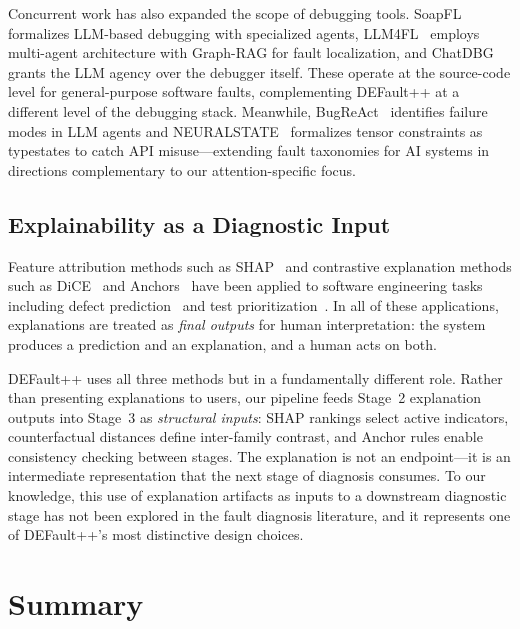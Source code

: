 Concurrent work has also expanded the scope of debugging tools. SoapFL~\cite{soapfl2025} formalizes LLM-based debugging with specialized agents, LLM4FL~\cite{llm4fl2024} employs multi-agent architecture with Graph-RAG for fault localization, and ChatDBG~\cite{chatdbg2025} grants the LLM agency over the debugger itself. These operate at the source-code level for general-purpose software faults, complementing DEFault++ at a different level of the debugging stack. Meanwhile, BugReAct~\cite{bugreact2026} identifies failure modes in LLM agents and NEURALSTATE~\cite{neuralstate2026} formalizes tensor constraints as typestates to catch API misuse---extending fault taxonomies for AI systems in directions complementary to our attention-specific focus.

\subsection{Explainability as a Diagnostic Input}
\label{subsec:rw_explainability}

Feature attribution methods such as SHAP~\cite{lundberg2017unified} and contrastive explanation methods such as DiCE~\cite{mothilal2020dice} and Anchors~\cite{ribeiro2018anchors} have been applied to software engineering tasks including defect prediction~\cite{jiarpakdee2020empirical} and test prioritization~\cite{spieker2021reinforcement}. In all of these applications, explanations are treated as \emph{final outputs} for human interpretation: the system produces a prediction and an explanation, and a human acts on both.

DEFault++ uses all three methods but in a fundamentally different role. Rather than presenting explanations to users, our pipeline feeds Stage~2 explanation outputs into Stage~3 as \emph{structural inputs}: SHAP rankings select active indicators, counterfactual distances define inter-family contrast, and Anchor rules enable consistency checking between stages. The explanation is not an endpoint---it is an intermediate representation that the next stage of diagnosis consumes. To our knowledge, this use of explanation artifacts as inputs to a downstream diagnostic stage has not been explored in the fault diagnosis literature, and it represents one of DEFault++'s most distinctive design choices.

\section{Summary}
\label{sec:defaultpp_summary}

